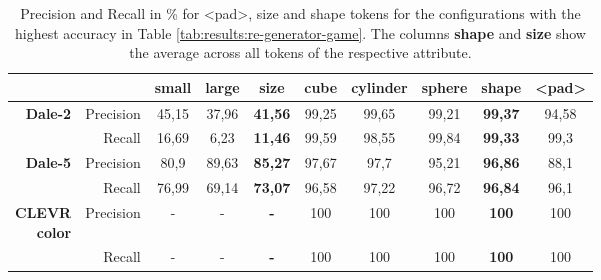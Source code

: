 \begin{table}[ht]
    \centering
    \begin{tabular}{rr|cc|c|ccc|c|c}
        \toprule
                                         &             & {small} & {large} & \textbf{size}  & {cube}  & {cylinder} & {sphere} & \textbf{shape} & {<pad>} \\\midrule
        \multirow{2}{*}{\textbf{Dale-2}} & {Precision} & {45,15} & {37,96} & \textbf{41,56} & {99,25} & {99,65}    & {99,21}  & \textbf{99,37} & {94,58} \\
                                         & {Recall}    & {16,69} & {6,23}  & \textbf{11,46} & {99,59} & {98,55}    & {99,84}  & \textbf{99,33} & {99,3}  \\\midrule
        \multirow{2}{*}{\textbf{Dale-5}} & {Precision} & {80,9}  & {89,63} & \textbf{85,27} & {97,67} & {97,7}     & {95,21}  & \textbf{96,86} & {88,1}  \\
                                         & {Recall}    & {76,99} & {69,14} & \textbf{73,07} & {96,58} & {97,22}    & {96,72}  & \textbf{96,84} & {96,1}  \\\midrule
        \multirowcell{2}[0pt][r]{\textbf{CLEVR}                                                                                                          \\\textbf{color}} & {Precision}  & {-}     & {-}     & \textbf{-}     & {100}   & {100}      & {100}    & \textbf{100}   & {100}   \\
                                         & {Recall}    & {-}     & {-}     & \textbf{-}     & {100}   & {100}      & {100}    & \textbf{100}   & {100}   \\
        \bottomrule
    \end{tabular}
    \caption{Precision and Recall in \% for <pad>, size and shape tokens for the configurations with the highest accuracy in Table \ref{tab:results:re-generator-game}. The columns \textbf{shape} and \textbf{size} show the average across all tokens of the respective attribute.}
    \label{tab:results:re-generator-game_size-shape}
\end{table}

